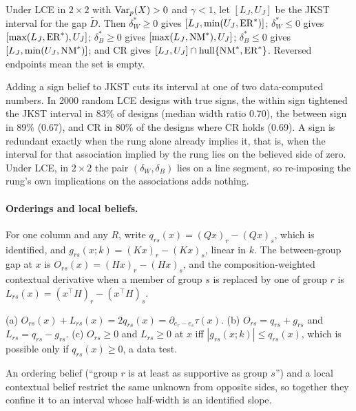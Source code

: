 \begin{proposition}\label{prop:G2}
Under LCE in $2\times2$ with $\operatorname{Var}_p(X)>0$ and $\gamma<1$, let $[L_J,U_J]$ be the
JKST interval for the gap $\tilde D$. Then $\delta^*_W\ge0$ gives
$[L_J,\min(U_J,\mathrm{ER}^*)]$; $\delta^*_W\le0$ gives $[\max(L_J,\mathrm{ER}^*),U_J]$;
$\delta^*_B\ge0$ gives $[\max(L_J,\mathrm{NM}^*),U_J]$; $\delta^*_B\le0$ gives
$[L_J,\min(U_J,\mathrm{NM}^*)]$; and CR gives $[L_J,U_J]\cap\operatorname{hull}\{\mathrm{NM}^*,\mathrm{ER}^*\}$.
Reversed endpoints mean the set is empty.
\end{proposition}
\begin{reading}
Adding a sign belief to JKST cuts its interval at one of two data-computed
numbers. In 2000 random LCE designs with true signs, the within sign tightened the
JKST interval in 83\% of designs (median width ratio 0.70), the between sign in
89\% (0.67), and CR in 80\% of the designs where CR holds (0.69). A sign is
redundant exactly when the rung alone already implies it, that is, when the
interval for that association implied by the rung lies on the believed side of
zero. Under LCE, in $2\times2$ the pair
$(\delta_W,\delta_B)$ lies on a line segment, so re-imposing the rung's own
implications on the associations adds nothing.
\end{reading}

\paragraph{Orderings and local beliefs.} For one column and any $R$, write
$q_{rs}(x)=(Qx)_r-(Qx)_s$, which is identified, and $g_{rs}(x;k)=(Kx)_r-(Kx)_s$,
linear in $k$. The between-group gap at $x$ is $O_{rs}(x)=(Hx)_r-(Hx)_s$, and the
composition-weighted contextual derivative when a member of group $s$ is replaced
by one of group $r$ is $L_{rs}(x)=(x^\top H)_r-(x^\top H)_s$.

\begin{proposition}[Sandwich]\label{prop:sandwich}
(a) $O_{rs}(x)+L_{rs}(x)=2q_{rs}(x)=\partial_{e_r-e_s}\tau(x)$. (b)
$O_{rs}=q_{rs}+g_{rs}$ and $L_{rs}=q_{rs}-g_{rs}$. (c) $O_{rs}\ge0$ and
$L_{rs}\ge0$ at $x$ iff $|g_{rs}(x;k)|\le q_{rs}(x)$, which is possible only if
$q_{rs}(x)\ge0$, a data test.
\end{proposition}
\begin{reading}
An ordering belief (``group $r$ is at least as supportive as group $s$'') and a
local contextual belief restrict the same unknown from opposite sides, so together
they confine it to an interval whose half-width is an identified slope.
\end{reading}

